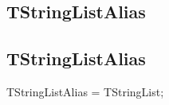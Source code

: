 \documentclass{report}
\newif\ifpdf
\begin{document}
\subsection*{\large{\textbf{TStringListAlias}}\normalsize\hspace{1ex}\hrulefill}
\else
\subsection*{TStringListAlias}
\fi
\label{ok_ancestors_links-TStringListAlias}
\begin{list}{}{
\setlength{\itemindent}{0cm}
\setlength{\listparindent}{0cm}
\setlength{\leftmargin}{\evensidemargin}
\addtolength{\leftmargin}{\tmplength}
\settowidth{\labelsep}{X}
\addtolength{\leftmargin}{\labelsep}
\setlength{\labelwidth}{\tmplength}
}
\item[\textbf{Declaration}\hfill]
\ifpdf
\begin{flushleft}
\fi
\begin{ttfamily}
TStringListAlias = TStringList;\end{ttfamily}

\ifpdf
\end{flushleft}
\fi

\end{list}
\end{document}

